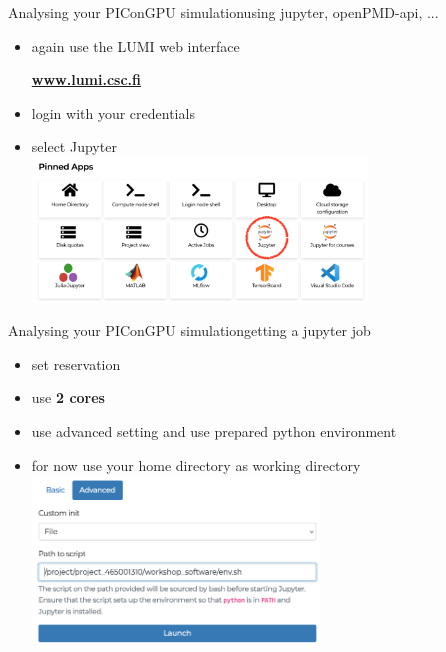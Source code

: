 \documentclass[
  aspectratio=169,
  10pt
]{beamer}
\begin{document}
\begin{frame}[t,fragile]{Analysing your PIConGPU simulation}{using jupyter, openPMD-api, ...}

\begin{itemize}
    \item again use the LUMI web interface 
    \begin{center}\textbf{\url{www.lumi.csc.fi}}\end{center}
    \item login with your credentials 
    \item select Jupyter\\
    \includegraphics[width=0.7\textwidth]{images/LUMI_web_jupyter.png}
\end{itemize}

\end{frame}



\begin{frame}[t,fragile]{Analysing your PIConGPU simulation}{getting a jupyter job}

\begin{itemize}
    \item set reservation
    \item use \textbf{2 cores}
    \item use advanced setting and use prepared python environment 
    \item for now use your home directory as working directory
    \includegraphics[width=0.6\textwidth]{images/LUMI_jupyterSetup.png}
\end{itemize}

\end{frame}
\end{document}
